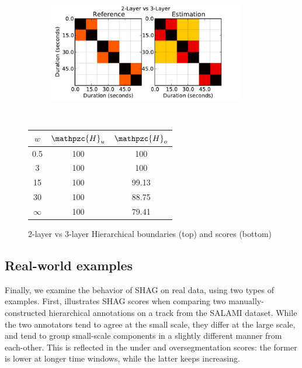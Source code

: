 \documentclass{article}
\def\shag{\ensuremath{\mathpzc{H}}}
\begin{document}
\begin{figure}[t]
  \centering
  \begin{subfigure}{0.5\textwidth}
    \centering
    \includegraphics[width=0.94\textwidth]{plots/hier-hiercomp.pdf}
  \end{subfigure}%
  \\
  \begin{minipage}{0.5\textwidth}
    \centering
    \vspace{10pt}
    \begin{tabular}{|c|c|c|}
      \hline
      $w$       & $\shag_u$       & $\shag_o$      \\
      \hline
      0.5       & 100       & 100      \\     
      3         & 100       & 100      \\
      15        & 100       & 99.13    \\
      30        & 100       & 88.75    \\
      $\infty$  & 100       & 79.41    \\
      \hline
    \end{tabular}
  \end{minipage}
  \caption{2-layer vs 3-layer Hierarchical boundaries (top) and scores (bottom)}
  \label{fig:hier-hiercomp}
\end{figure}


\subsection{Real-world examples}
Finally, we examine the behavior of SHAG on real data, using two types of examples.
First,  illustrates SHAG scores when comparing two manually-constructed hierarchical annotations on a track from the SALAMI dataset.
While the two annotators tend to agree at the small scale, they differ at the large scale, and tend to group small-scale components in a slightly different manner from each-other.
This is reflected in the under and oversegmentation scores: the former is lower at longer time windows, while the latter keeps increasing.
\end{document}
